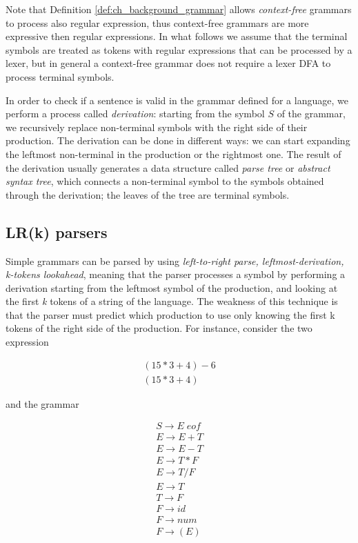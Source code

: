 \noindent
Note that Definition \ref{def:ch_background_grammar} allows \textit{context-free} grammars to process also regular expression, thus context-free grammars are more expressive then regular expressions. In what follows we assume that the terminal symbols are treated as tokens with regular expressions that can be processed by a lexer, but in general a context-free grammar does not require a lexer DFA to process terminal symbols.

In order to check if a sentence is valid in the grammar defined for a language, we perform a process called \textit{derivation}: starting from the symbol $S$ of the grammar, we recursively replace non-terminal symbols with the right side of their production. The derivation can be done in different ways: we can start expanding the leftmost non-terminal in the production or the rightmost one. The result of the derivation usually generates a data structure called \textit{parse tree} or \textit{abstract syntax tree}, which connects a non-terminal symbol to the symbols obtained through the derivation; the leaves of the tree are terminal symbols.

\subsection{LR(k) parsers}
Simple grammars can be parsed by using \textit{left-to-right parse, leftmost-derivation, k-tokens lookahead}, meaning that the parser processes a symbol by performing a derivation starting from the leftmost symbol of the production, and looking at the first \textit{k} tokens of a string of the language. The weakness of this technique is that the parser must predict which production to use only knowing the first k tokens of the right side of the production. For instance, consider the two expression

\begin{equation*}
	\begin{array}{l}
		(15 * 3 + 4) - 6\\
		(15 * 3 + 4)
	\end{array}
\end{equation*}

\noindent
and the grammar

\begin{equation*}
	\begin{array}{l}
		S \rightarrow E \; eof\\
		E \rightarrow E + T\\
		E \rightarrow E - T\\
		E \rightarrow T * F\\
		E \rightarrow T / F\\
		E \rightarrow T\\
		T \rightarrow F\\
		F \rightarrow id\\
		F \rightarrow num\\
		F \rightarrow ( E )	
	\end{array}
\end{equation*}

